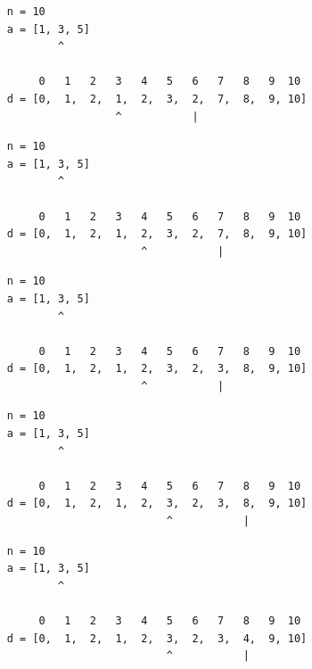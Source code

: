\begin{frame}[fragile]
\begin{verbatim}
     n = 10
     a = [1, 3, 5]
             ^

          0   1   2   3   4   5   6   7   8   9  10
     d = [0,  1,  2,  1,  2,  3,  2,  7,  8,  9, 10]
                      ^           |
\end{verbatim}
\end{frame}
\addtocounter{framenumber}{-1}

\begin{frame}[fragile]
\begin{verbatim}
     n = 10
     a = [1, 3, 5]
             ^

          0   1   2   3   4   5   6   7   8   9  10
     d = [0,  1,  2,  1,  2,  3,  2,  7,  8,  9, 10]
                          ^           |
\end{verbatim}
\end{frame}
\addtocounter{framenumber}{-1}

\begin{frame}[fragile]
\begin{verbatim}
     n = 10
     a = [1, 3, 5]
             ^

          0   1   2   3   4   5   6   7   8   9  10
     d = [0,  1,  2,  1,  2,  3,  2,  3,  8,  9, 10]
                          ^           |
\end{verbatim}
\end{frame}
\addtocounter{framenumber}{-1}

\begin{frame}[fragile]
\begin{verbatim}
     n = 10
     a = [1, 3, 5]
             ^

          0   1   2   3   4   5   6   7   8   9  10
     d = [0,  1,  2,  1,  2,  3,  2,  3,  8,  9, 10]
                              ^           |
\end{verbatim}
\end{frame}
\addtocounter{framenumber}{-1}

\begin{frame}[fragile]
\begin{verbatim}
     n = 10
     a = [1, 3, 5]
             ^

          0   1   2   3   4   5   6   7   8   9  10
     d = [0,  1,  2,  1,  2,  3,  2,  3,  4,  9, 10]
                              ^           |
\end{verbatim}
\end{frame}
\addtocounter{framenumber}{-1}

